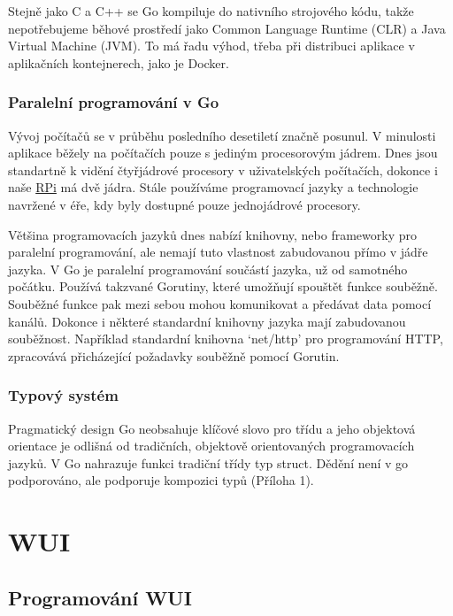 \documentclass[czech,12pt,a4paper]{article}
\begin{document}
Stejně jako C a C++ se Go kompiluje do nativního strojového kódu, takže
nepotřebujeme běhové prostředí jako Common Language Runtime (CLR) a Java Virtual Machine (JVM). To má řadu výhod, třeba při distribuci aplikace v aplikačních kontejnerech, jako je Docker.

\subsubsection{Paralelní programování v Go}

Vývoj počítačů se v průběhu posledního desetiletí značně posunul. V minulosti aplikace běžely na počítačích pouze s jediným procesorovým jádrem. Dnes jsou standartně k vidění čtyřjádrové procesory v uživatelských počítačích, dokonce i naše \underline{\ac{RPi}} má dvě jádra. Stále používáme programovací jazyky a technologie navržené v éře, kdy byly dostupné pouze jednojádrové procesory.

Většina programovacích jazyků dnes nabízí knihovny, nebo frameworky pro \linebreak paralelní programování, ale nemají tuto vlastnost zabudovanou přímo v jádře jazyka. V Go je paralelní programování součástí jazyka, už od samotného počátku. Používá takzvané Gorutiny, které umožňují spouštět funkce souběžně. Souběžné funkce pak mezi sebou mohou komunikovat a předávat data pomocí kanálů. Dokonce i některé standardní knihovny jazyka mají zabudovanou souběžnost. Například standardní knihovna `net/http' pro programování HTTP, zpracovává přicházející požadavky souběžně pomocí Gorutin.

\subsubsection{Typový systém}

Pragmatický design Go neobsahuje klíčové slovo pro třídu a jeho objektová orientace je odlišná od tradičních, objektově orientovaných programovacích jazyků. V Go nahrazuje funkci tradiční třídy typ struct. Dědění není v go podporováno, ale podporuje kompozici typů (Příloha 1).

\clearpage

\section{WUI} \label{secWUI}

\subsection{Programování WUI}
\end{document}

